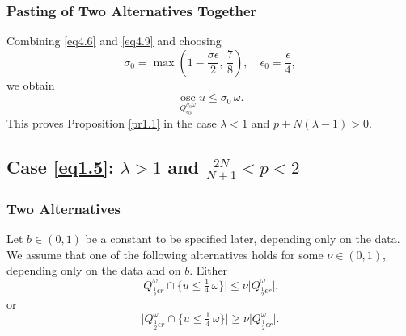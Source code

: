 \documentclass[a4paper,11pt,fullpage]{article}
\DeclareMathOperator*{\osc}{osc}
\numberwithin{equation}{section}
\begin{document}
\subsubsection{Pasting of Two Alternatives Together}
Combining \eqref{eq4.6} and \eqref{eq4.9} and choosing 
$$\sigma_0=\max\left(1-\frac{\sigma\bar{\epsilon}}{2} ,\,\frac{7}{8}\right),\quad 
\epsilon_0= \frac{\epsilon}{4},$$
we obtain
\begin{equation}\label{eq4.10}
 \osc\limits_{Q^{\sigma_0 \omega}_{\epsilon_0 r}} u  \leqslant \sigma_0\,\omega.
\end{equation}
This proves Proposition \ref{pr1.1} in the case $\lambda<1$ and $p+N(\lambda-1)>0$.

\subsection{Case \eqref{eq1.5}: $\lambda>1$ and $\frac{2N}{N+1}<p<2$}\label{sec-case2}

\subsubsection{Two Alternatives}

Let $b\in(0,1)$ be a constant to be specified later, depending only on the data. We assume that one of the following alternatives holds for some $\nu\in(0,1)$, depending only on the data and on $b$. 
Either
\begin{equation}\label{eq6.3}
\big| Q^{\omega}_{\frac{1}{2}\epsilon r}\cap\{u\leqslant \tfrac{1}{4}\,\omega\}\big|\leqslant \nu \big|Q^{\omega}_{\frac{1}{2}\epsilon r}\big|,
\end{equation}
or
\begin{equation}\label{eq6.4}
\big| Q^{\omega}_{\frac{1}{2}\epsilon r}\cap\{u\leqslant \tfrac{1}{4}\,\omega \}\big|\geqslant \nu \big|Q^{\omega}_{\frac{1}{2}\epsilon r}\big|.
\end{equation}
\end{document}
